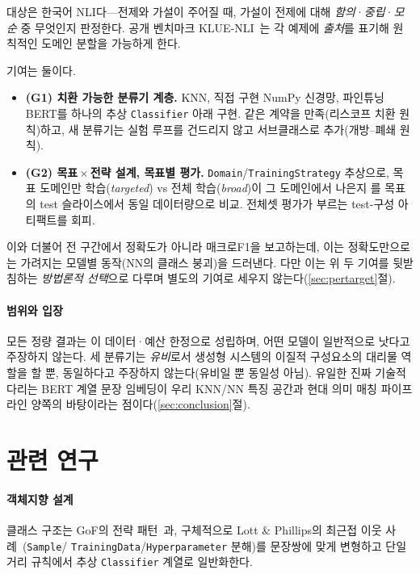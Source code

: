 \documentclass[conference]{IEEEtran}
\begin{document}
대상은 한국어 NLI다---전제와 가설이 주어질 때, 가설이 전제에 대해
\emph{함의}·\emph{중립}·\emph{모순} 중 무엇인지 판정한다. 공개 벤치마크
KLUE-NLI~\cite{park2021klue}는 각 예제에 \emph{출처}를 표기해 원칙적인 도메인
분할을 가능하게 한다.

기여는 둘이다.
\begin{itemize}
  \item \textbf{(G1) 치환 가능한 분류기 계층.} KNN, 직접 구현 NumPy 신경망,
        파인튜닝 BERT를 하나의 추상 \texttt{Classifier} 아래 구현. 같은 계약을
        만족(리스코프 치환 원칙)하고, 새 분류기는 실험 루프를 건드리지 않고
        서브클래스로 추가(개방--폐쇄 원칙).
  \item \textbf{(G2) 목표\,$\times$\,전략 설계, 목표별 평가.}
        \texttt{Domain}/\texttt{TrainingStrategy} 추상으로, 목표 도메인만
        학습(\emph{targeted}) vs 전체 학습(\emph{broad})이 그 도메인에서 나은지
        를 목표의 test 슬라이스에서 동일 데이터량으로 비교. 전체셋 평가가 부르는
        test-구성 아티팩트를 회피.
\end{itemize}
이와 더불어 전 구간에서 정확도가 아니라 매크로F1을 보고하는데, 이는 정확도만으로는
가려지는 모델별 동작(NN의 클래스 붕괴)을 드러낸다. 다만 이는 위 두 기여를 뒷받침하는
\emph{방법론적 선택}으로 다루며 별도의 기여로 세우지 않는다(\ref{sec:pertarget}절).

\paragraph*{범위와 입장}
모든 정량 결과는 이 데이터·예산 한정으로 성립하며, 어떤 모델이 일반적으로
낫다고 주장하지 않는다. 세 분류기는 \emph{유비}로서 생성형 시스템의 이질적
구성요소의 대리물 역할을 할 뿐, 동일하다고 주장하지 않는다(유비일 뿐 동일성
아님). 유일한 진짜 기술적 다리는 BERT 계열 문장 임베딩이 우리 KNN/NN 특징
공간과 현대 의미 매칭 파이프라인 양쪽의 바탕이라는 점이다(\ref{sec:conclusion}절).

\section{관련 연구}
\label{sec:related}
\paragraph*{객체지향 설계}
클래스 구조는 GoF의 전략 패턴~\cite{gamma1994design}과, 구체적으로 Lott \&
Phillips의 최근접 이웃 사례~\cite{lott2021python}(\texttt{Sample}/
\texttt{TrainingData}/\texttt{Hyperparameter} 분해)를 문장쌍에 맞게 변형하고
단일 거리 규칙에서 추상 \texttt{Classifier} 계열로 일반화한다.
\end{document}
